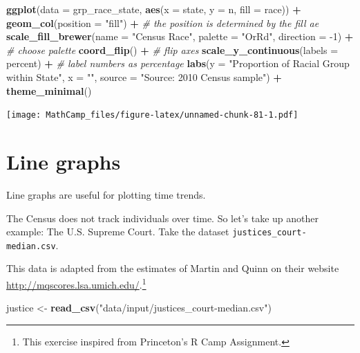 \documentclass[
]{book}
\newenvironment{Shaded}{\begin{snugshade}}{\end{snugshade}}
\newcommand{\CommentTok}[1]{\textcolor[rgb]{0.56,0.35,0.01}{\textit{#1}}}
\newcommand{\DataTypeTok}[1]{\textcolor[rgb]{0.13,0.29,0.53}{#1}}
\newcommand{\DecValTok}[1]{\textcolor[rgb]{0.00,0.00,0.81}{#1}}
\newcommand{\KeywordTok}[1]{\textcolor[rgb]{0.13,0.29,0.53}{\textbf{#1}}}
\newcommand{\NormalTok}[1]{#1}
\newcommand{\OperatorTok}[1]{\textcolor[rgb]{0.81,0.36,0.00}{\textbf{#1}}}
\newcommand{\StringTok}[1]{\textcolor[rgb]{0.31,0.60,0.02}{#1}}
\theoremstyle{definition}
\theoremstyle{definition}
\theoremstyle{definition}
\theoremstyle{definition}
\theoremstyle{remark}
\begin{document}
\begin{Shaded}
\begin{Highlighting}[]
\KeywordTok{ggplot}\NormalTok{(}\DataTypeTok{data =}\NormalTok{ grp_race_state, }\KeywordTok{aes}\NormalTok{(}\DataTypeTok{x =}\NormalTok{  state, }\DataTypeTok{y =}\NormalTok{ n,  }\DataTypeTok{fill =}\NormalTok{ race)) }\OperatorTok{+}
\StringTok{  }\KeywordTok{geom_col}\NormalTok{(}\DataTypeTok{position =} \StringTok{"fill"}\NormalTok{) }\OperatorTok{+}\StringTok{ }\CommentTok{# the position is determined by the fill ae}
\StringTok{  }\KeywordTok{scale_fill_brewer}\NormalTok{(}\DataTypeTok{name =} \StringTok{"Census Race"}\NormalTok{, }\DataTypeTok{palette =} \StringTok{"OrRd"}\NormalTok{, }\DataTypeTok{direction =} \DecValTok{-1}\NormalTok{) }\OperatorTok{+}\StringTok{ }\CommentTok{# choose palette}
\StringTok{  }\KeywordTok{coord_flip}\NormalTok{() }\OperatorTok{+}\StringTok{ }\CommentTok{# flip axes}
\StringTok{  }\KeywordTok{scale_y_continuous}\NormalTok{(}\DataTypeTok{labels =}\NormalTok{ percent) }\OperatorTok{+}\StringTok{ }\CommentTok{# label numbers as percentage}
\StringTok{  }\KeywordTok{labs}\NormalTok{(}\DataTypeTok{y =} \StringTok{"Proportion of Racial Group within State"}\NormalTok{,}
       \DataTypeTok{x =} \StringTok{""}\NormalTok{,}
       \DataTypeTok{source =} \StringTok{"Source: 2010 Census  sample"}\NormalTok{) }\OperatorTok{+}
\StringTok{  }\KeywordTok{theme_minimal}\NormalTok{()}
\end{Highlighting}
\end{Shaded}

\texttt{[image: MathCamp\_files/figure-latex/unnamed-chunk-81-1.pdf]}

\hypertarget{line-graphs}{%
\section{Line graphs}\label{line-graphs}}

Line graphs are useful for plotting time trends.

The Census does not track individuals over time. So let's take up another example: The U.S. Supreme Court. Take the dataset \texttt{justices\_court-median.csv}.

This data is adapted from the estimates of Martin and Quinn on their website \url{http://mqscores.lsa.umich.edu/}.\footnote{This exercise inspired from Princeton's R Camp Assignment.}

\begin{Shaded}
\begin{Highlighting}[]
\NormalTok{justice <-}\StringTok{ }\KeywordTok{read_csv}\NormalTok{(}\StringTok{"data/input/justices_court-median.csv"}\NormalTok{)}
\end{Highlighting}
\end{Shaded}
\end{document}
